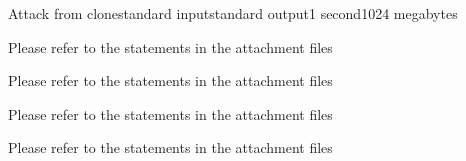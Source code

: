 \begin{problem}{Attack from clone}{standard input}{standard output}{1 second}{1024 megabytes}

Please refer to the statements in the attachment files

\InputFile
Please refer to the statements in the attachment files

\OutputFile
Please refer to the statements in the attachment files

\Example

\begin{example}
%
\end{example}

\Note
Please refer to the statements in the attachment files

\end{problem}

